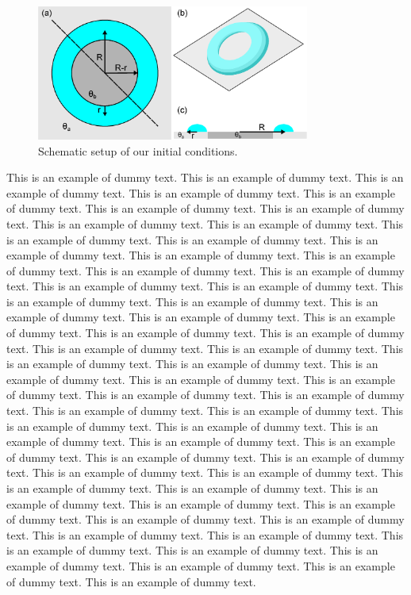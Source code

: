 \documentclass[lineno]{jfm}
\begin{document}
\begin{figure}
    \centerline{\includegraphics[width=0.8\textwidth]{ringrivulet_shema}}%
  \caption{Schematic setup of our initial conditions.}
\label{fig:intro}
\end{figure}
This is an example of dummy text. This is an example of dummy text. This is an example of dummy text. This is an example of dummy text. This is an example of dummy text. This is an example of dummy text. This is an example of dummy text. This is an example of dummy text. This is an example of dummy text. This is an example of dummy text. This is an example of dummy text. This is an example of dummy text. This is an example of dummy text. This is an example of dummy text. This is an example of dummy text. This is an example of dummy text. This is an example of dummy text. This is an example of dummy text. This is an example of dummy text. This is an example of dummy text. This is an example of dummy text. This is an example of dummy text. This is an example of dummy text. This is an example of dummy text. This is an example of dummy text. This is an example of dummy text. This is an example of dummy text. This is an example of dummy text. This is an example of dummy text. This is an example of dummy text. This is an example of dummy text. This is an example of dummy text. This is an example of dummy text. This is an example of dummy text. This is an example of dummy text. This is an example of dummy text. This is an example of dummy text. This is an example of dummy text. This is an example of dummy text. This is an example of dummy text. This is an example of dummy text. This is an example of dummy text. This is an example of dummy text. This is an example of dummy text. This is an example of dummy text. This is an example of dummy text. This is an example of dummy text. This is an example of dummy text. This is an example of dummy text. This is an example of dummy text. This is an example of dummy text. This is an example of dummy text. This is an example of dummy text. This is an example of dummy text. This is an example of dummy text. This is an example of dummy text. This is an example of dummy text. This is an example of dummy text. This is an example of dummy text. This is an example of dummy text. 
 
\end{document}
